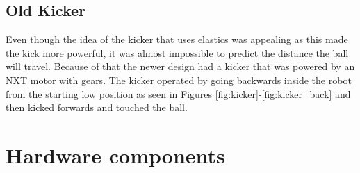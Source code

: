 \documentclass[a4paper,12pt]{article}
\begin{document}
%	

\subsection{Old Kicker}
Even though the idea of the kicker that uses elastics was appealing as this made
the kick more powerful, it was almost impossible to predict the distance the
ball will travel. Because of that the newer design had a
kicker that was powered by an NXT motor with gears. The kicker operated by going backwards inside the robot from the starting low position as seen in Figures \ref{fig:kicker}-\ref{fig:kicker_back} and then kicked
forwards and touched the ball.
%		

\section{Hardware components}
\end{document}

